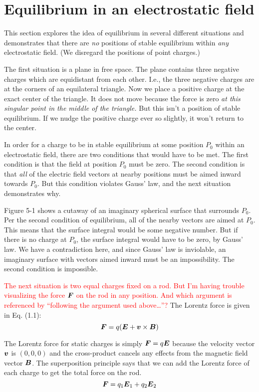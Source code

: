 \section{Equilibrium in an electrostatic field}

This section explores the idea of equilibrium in several different situations
and demonstrates that there are \emph{no} positions of stable equilibrium
within \emph{any} electrostatic field. (We disregard the positions of point charges.)

The first situation is a plane in free space.
The plane contains three negative charges which are equidistant from each other.
I.e., the three negative charges are at the corners of an equilateral triangle.
Now we place a positive charge at the exact center of the triangle.
It does not move because the force is zero
\emph{at this singular point in the middle of the triangle.}
But this isn't a position of stable equilibrium.
If we nudge the positive charge ever so slightly, it won't return to the center.

In order for a charge to be in stable equilibrium at some position $P_0$ 
within an electrostatic field, there are two conditions that would have to be met.
The first condition is that the field at position $P_0$ must be zero.
The second condition is that \emph{all} of the electric field vectors at nearby positions
must be aimed inward towards $P_0$. But this condition violates Gauss' law,
and the next situation demonstrates why.

Figure 5-1 shows a cutaway of an imaginary spherical surface that surrounds $P_0$.
Per the second condition of equilibrium, all of the nearby vectors are aimed at $P_0$.
This means that the surface integral would be some negative number.
But if there is no charge at $P_0$, the surface integral would have to be zero, by Gauss' law.
We have a contradiction here, and since Gauss' law is inviolable, an imaginary surface
with vectors aimed inward must be an impossibility. The second condition is impossible.

\textcolor{red}{The next situation is two equal charges fixed on a rod.
But I'm having trouble visualizing the force $\boldsymbol{F}$ on the rod in any position.
And which argument is referenced by ``following the argument used above\ldots''?}
The Lorentz force is given in Eq. (1.1):
\begin{equation*}
  \boldsymbol{F} = q(\boldsymbol{E} + \boldsymbol{v} \times \boldsymbol{B})
\end{equation*}

The Lorentz force for static charges is simply $\boldsymbol{F} = q\boldsymbol{E}$
because the velocity vector $\boldsymbol{v}$ is $(0,0,0)$ and the cross-product
cancels any effects from the magnetic field vector $\boldsymbol{B}$.
The superposition principle says that we can add the Lorentz force
of each charge to get the total force on the rod.
\begin{equation}
  \boldsymbol{F} = q_1 \boldsymbol{E}_1 + q_2 \boldsymbol{E}_2
\end{equation}

